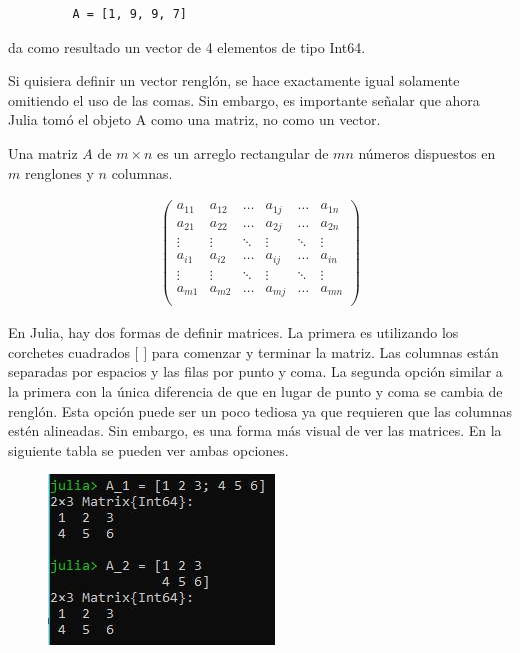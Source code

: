\begin{tcolorbox}
      \begin{verbatim}
         A = [1, 9, 9, 7]
      \end{verbatim}
\end{tcolorbox}
da como resultado un vector de 4 elementos de tipo Int64. 

Si quisiera definir un vector renglón, se hace exactamente igual solamente omitiendo el uso de las comas. Sin embargo, es importante señalar que  ahora Julia tomó el objeto A como una matriz, no como un vector. 

\begin{definition}
Una matriz $A$ de $m \times n$ es un arreglo rectangular de $mn$ números dispuestos en $m$ renglones y $n$ columnas. 

\begin{equation*}
    \begin{aligned}
    \begin{pmatrix}
    a_{11} & a_{12} & \dots & a_{1j} & \dots & a_{1n} \\
    a_{21} & a_{22} & \dots & a_{2j} & \dots & a_{2n} \\
    \vdots &  \vdots  &  \ddots &  \vdots  & \ddots &\vdots\\
    a_{i1} & a_{i2} & \dots & a_{ij} & \dots & a_{in} \\
    \vdots &  \vdots  &  \ddots &  \vdots  & \ddots &\vdots\\
     a_{m1} & a_{m2} & \dots & a_{mj} & \dots & a_{mn} \\
    \end{pmatrix} 
    \end{aligned}
\end{equation*}
\end{definition}


En Julia, hay dos formas de definir matrices. La primera es utilizando los corchetes cuadrados $[$ $]$ para comenzar y terminar la matriz. Las columnas están separadas por espacios y las filas por punto y coma. La segunda opción similar a la primera con la única diferencia de que en lugar de punto y coma se cambia de renglón. Esta opción puede ser un poco tediosa ya que requieren que las columnas estén alineadas. Sin embargo, es una forma más visual de ver las matrices. En la siguiente tabla se pueden ver ambas opciones. 

\begin{figure}[h]
\begin{center}
\includegraphics[scale=0.8]{Imagenes/definir_matrices.JPG}
  \label{definicion_matrices}
\end{center}
\end{figure}

